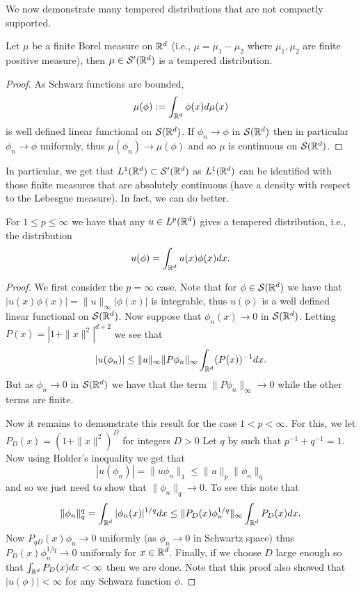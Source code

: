 \documentclass[twoside, a4paper, 10pt]{amsart}
\begin{document}
We now demonstrate many tempered distributions that are not compactly supported.

\begin{prop} Let $\mu$ be a finite Borel measure on $\mathbb{R}^d$ (i.e., $\mu = \mu_1 - \mu_2$ where $\mu_1,\mu_2$ are finite positive measure), then $\mu \in \mathcal{S}'(\mathbb{R}^d)$ is a tempered distribution.

\end{prop}

\begin{proof} As Schwarz functions are bounded, $$\mu(\phi) := \int_{\mathbb{R}^d} \phi(x) d\mu(x)$$ is well defined linear functional on $\mathcal{S}(\mathbb{R}^d)$. If $\phi_n \to \phi$ in $\mathcal{S}(\mathbb{R}^d)$ then in particular $\phi_n \to \phi$ uniformly, thus $\mu(\phi_n) \to \mu(\phi)$ and so $\mu$ is continuous on $\mathcal{S}(\mathbb{R}^d)$. \end{proof}

In particular, we get that $L^1(\mathbb{R}^d) \subset \mathcal{S}'(\mathbb{R}^d)$ as $L^1(\mathbb{R}^d)$ can be identified with those finite measures that are absolutely continuous (have a density with respect to the Lebesgue measure). In fact, we can do better.

\begin{prop}\label{prop: Lp are tempered} For $1 \leq p \leq \infty$ we have that any $u \in L^p(\mathbb{R}^d)$ gives a tempered distribution, i.e., the distribution $$u(\phi) = \int_{\mathbb{R}^d} u(x)\phi(x) dx.$$

\end{prop}

\begin{proof} We first consider the $p = \infty$ case. Note that for $\phi \in \mathcal{S}(\mathbb{R}^d)$ we have that $|u(x)\phi(x)| = \|u\|_{\infty} |\phi(x)|$ is integrable, thus $u(\phi)$ is a well defined linear functional on $\mathcal{S}(\mathbb{R}^d)$. Now suppose that $\phi_n(x) \to 0$ in $\mathcal{S}(\mathbb{R}^d)$. Letting $P(x) = |1+ \|x\|^2|^{d+2}$ we see that $$|u(\phi_n)| \leq \|u \|_{\infty} \| P \phi_n \|_{\infty} \int_{\mathbb{R}^d} (P(x))^{-1} dx.$$ But as $\phi_n \to 0$ in $\mathcal{S}(\mathbb{R}^d)$ we have that the term $ \| P \phi_n \|_{\infty} \to 0$ while the other terms are finite. 

Now it remains to demonstrate this result for the case $1<p<\infty$. For this, we let $P_D(x) = (1+\|x\|^2)^{D}$ for integers $D>0$ Let $q$ by such that $p^{-1} + q^{-1} = 1$. Now using Holder's inequality we get that $$|u(\phi_n)| = \| u\phi_n \|_1 \leq \|u \|_{p} \| \phi_n \|_q$$ and so we just need to show that $\| \phi_n \|_q \to 0$. To see this note that $$\| \phi_n \|_q^q = \int_{\mathbb{R}^d} |\phi_n(x)|^{1/q} dx \leq \| P_D(x) \phi_n^{1/q} \|_{\infty} \int_{\mathbb{R}^d} P_D(x) dx.$$ Now $P_{qD}(x)\phi_n \to 0$ uniformly (as $\phi_n \to 0$ in Schwartz space) thus $P_D(x)\phi_n^{1/q} \to 0$ uniformly for $x \in \mathbb{R}^d$. Finally, if we choose $D$ large enough so that $\int_{\mathbb{R}^d} P_D(x) dx < \infty$ then we are done. Note that this proof also showed that $|u(\phi)| < \infty$ for any Schwarz function $\phi$. \end{proof}
\end{document}
